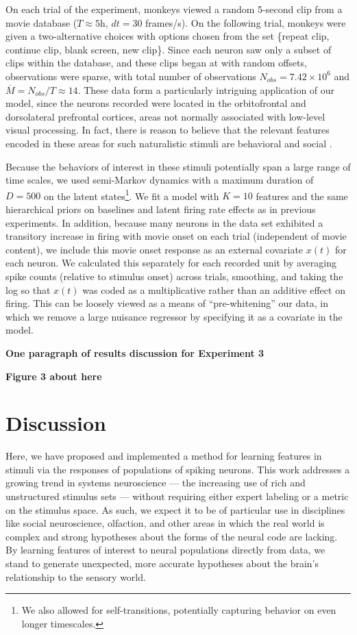\documentclass{article} %
\begin{document}
On each trial of the experiment, monkeys viewed a random 5-second clip from a movie database ($T \approx 5$h, $dt = 30$ frames/s). On the following trial, monkeys were given a two-alternative choices with options chosen from the set \{repeat clip, continue clip, blank screen, new clip\}. Since each neuron saw only a subset of clips within the database, and these clips began at with random offsets, observations were sparse, with total number of observations $N_{obs} = 7.42 \times 10^6$ and $\overline{M} = N_{obs}/T \approx 14$. These data form a particularly intriguing application of our model, since the neurons recorded were located in the orbitofrontal and dorsolateral prefrontal cortices, areas not normally associated with low-level visual processing. In fact, there is reason to believe that the relevant features encoded in these areas for such naturalistic stimuli are behavioral and social \cite{watson2012social}.

Because the behaviors of interest in these stimuli potentially span a large range of time scales, we used semi-Markov dynamics with a maximum duration of $D = 500$ on the latent states\footnote{We also allowed for self-transitions, potentially capturing behavior on even longer timescales.}. We fit a model with $K=10$ features and the same hierarchical priors on baselines and latent firing rate effects as in previous experiments. In addition, because many neurons in the data set exhibited a transitory increase in firing with movie onset on each trial (independent of movie content), we include this movie onset response as an external covariate $x(t)$ for each neuron. We calculated this separately for each recorded unit by averaging spike counts (relative to stimulus onset) across trials, smoothing, and taking the log so that $x(t)$ was coded as a multiplicative rather than an additive effect on firing. This can be loosely viewed as a means of ``pre-whitening'' our data, in which we remove a large nuisance regressor by specifying it as a covariate in the model.

\textbf{One paragraph of results discussion for Experiment 3}

\textbf{Figure 3 about here}

\section{Discussion}
Here, we have proposed and implemented a method for learning features in stimuli via the responses of populations of spiking neurons. This work addresses a growing trend in systems neuroscience --- the increasing use of rich and unstructured stimulus sets --- without requiring either expert labeling or a metric on the stimulus space. As such, we expect it to be of particular use in disciplines like social neuroscience, olfaction, and other areas in which the real world is complex and strong hypotheses about the forms of the neural code are lacking. By learning features of interest to neural populations directly from data, we stand to generate unexpected, more accurate hypotheses about the brain's relationship to the sensory world.
\end{document}
